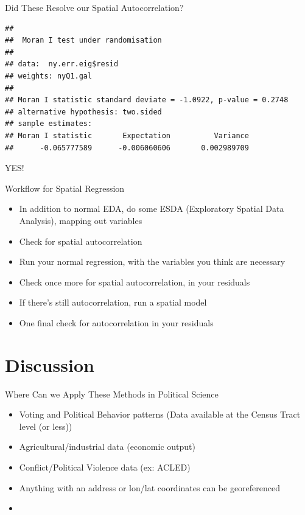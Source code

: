 \documentclass[aspectratio = 169, 12pt]{beamer}\usepackage[]{graphicx}\usepackage[]{color}
\makeatletter
\newenvironment{kframe}{%
 \def\at@end@of@kframe{}%
 \ifinner\ifhmode%
  \def\at@end@of@kframe{\end{minipage}}%
  \begin{minipage}{\columnwidth}%
 \fi\fi%
 \def\FrameCommand##1{\hskip\@totalleftmargin \hskip-\fboxsep
 \colorbox{shadecolor}{##1}\hskip-\fboxsep
     \hskip-\linewidth \hskip-\@totalleftmargin \hskip\columnwidth}%
 \MakeFramed {\advance\hsize-\width
   \@totalleftmargin\z@ \linewidth\hsize
   \@setminipage}}%
 {\par\unskip\endMakeFramed%
 \at@end@of@kframe}
\newenvironment{knitrout}{}{} %
\makeatother
\begin{document}
\begin{frame}[fragile]{Did These Resolve our Spatial Autocorrelation?}
\begin{knitrout}\tiny
{}\color{fgcolor}\begin{kframe}


{\ttfamily\noindent\bfseries\color{errorcolor}{\#\# Error in ogrInfo(dsn = dsn, layer = layer, encoding = encoding, use\_iconv = use\_iconv, : Cannot open data source}}\begin{verbatim}
## 
## 	Moran I test under randomisation
## 
## data:  ny.err.eig$resid  
## weights: nyQ1.gal  
## 
## Moran I statistic standard deviate = -1.0922, p-value = 0.2748
## alternative hypothesis: two.sided
## sample estimates:
## Moran I statistic       Expectation          Variance 
##      -0.065777589      -0.006060606       0.002989709
\end{verbatim}
\end{kframe}
\end{knitrout}
YES!
\end{frame}

\begin{frame}{Workflow for Spatial Regression}
\begin{itemize}
\item In addition to normal EDA, do some ESDA (Exploratory Spatial Data Analysis), mapping out variables
\item Check for spatial autocorrelation
\item Run your normal regression, with the variables you think are necessary
\item Check once more for spatial autocorrelation, in your residuals
\item If there's still autocorrelation, run a spatial model
\item One final check for autocorrelation in your residuals
\end{itemize}
\end{frame}

\section{Discussion}
\begin{frame}{Where Can we Apply These Methods in Political Science}
\begin{itemize}
\item Voting and Political Behavior patterns (Data available at the Census Tract level (or less))
\item Agricultural/industrial data (economic output)
\item Conflict/Political Violence data (ex: ACLED)
\item Anything with an address or lon/lat coordinates can be georeferenced
\item
\end{itemize}
\end{frame}
\end{document}
